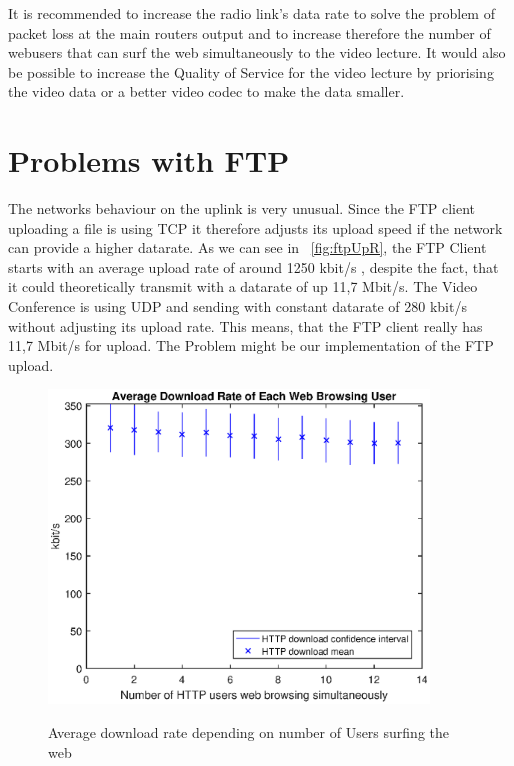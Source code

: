 \documentclass[a4paper,10pt]{book}\usepackage{graphicx}
\begin{document}
It is recommended to increase the radio link's data rate to solve the problem of packet loss at the main routers output and to increase therefore the number of webusers that can surf the web simultaneously to the video lecture. It would also be possible to increase the Quality of Service for the video lecture 
by priorising the video data or a better video codec to make the data smaller.
\section{Problems with FTP}
\label{sec:ftp}
The networks behaviour on the uplink is very unusual. Since the FTP client uploading a file is using TCP it therefore adjusts its upload speed if the network can provide a higher datarate.
As we can see in ~\ref{fig:ftpUpR}, the FTP Client starts with an average upload rate of around 1250 kbit/s , despite the fact, that it could theoretically transmit with a datarate of up  11,7 Mbit/s.
The Video Conference is using UDP and sending with constant datarate of 280 kbit/s without adjusting its upload rate. This means, that the FTP client really has 11,7 Mbit/s for upload. The Problem might be our implementation of the FTP upload. 

\begin{figure}[!ht]
  \centering
    \includegraphics[width=0.9\textwidth]{off_http_download.eps}
    \label{fig:httpDR}
    \caption{Average download rate depending on number of Users surfing the web}
\end{figure}
\end{document}
